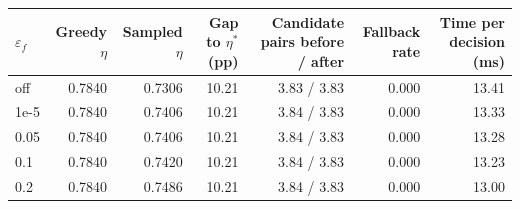 \begin{tabular}{lrrrrrr}
\toprule
$\varepsilon_f$ & Greedy $\eta$ & Sampled $\eta$ & Gap to $\eta^*$ (pp) & Candidate pairs before / after & Fallback rate & Time per decision (ms) \\
\midrule
off & 0.7840 & 0.7306 & 10.21 & 3.83 / 3.83 & 0.000 & 13.41 \\
1e-5 & 0.7840 & 0.7406 & 10.21 & 3.84 / 3.83 & 0.000 & 13.33 \\
0.05 & 0.7840 & 0.7406 & 10.21 & 3.84 / 3.83 & 0.000 & 13.28 \\
0.1 & 0.7840 & 0.7420 & 10.21 & 3.84 / 3.83 & 0.000 & 13.23 \\
0.2 & 0.7840 & 0.7486 & 10.21 & 3.84 / 3.83 & 0.000 & 13.00 \\
\bottomrule
\end{tabular}
